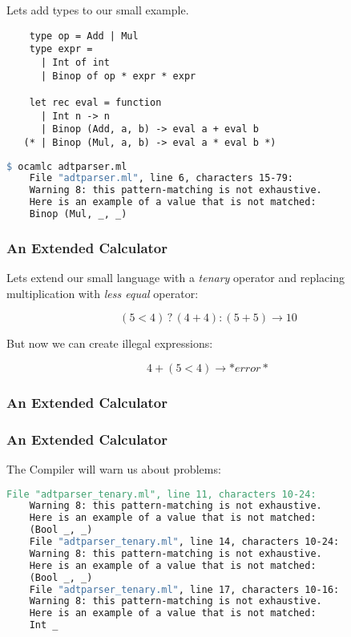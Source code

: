 \documentclass[xcolor=svgnames]{beamer}
\renewcommand{\_}{\mathunderscore}
\begin{document}
\begin{frame}[fragile]
  Lets add types to our small example.

  \begin{lstlisting}
    type op = Add | Mul
    type expr =
      | Int of int
      | Binop of op * expr * expr

    let rec eval = function
      | Int n -> n
      | Binop (Add, a, b) -> eval a + eval b
   (* | Binop (Mul, a, b) -> eval a * eval b *)

  \end{lstlisting}
  \pause
  \begin{lstlisting}[language=make]
    $ ocamlc adtparser.ml
    File "adtparser.ml", line 6, characters 15-79:
    Warning 8: this pattern-matching is not exhaustive.
    Here is an example of a value that is not matched:
    Binop (Mul, _, _)
  \end{lstlisting}

\end{frame}

\begin{frame}[fragile]
  \frametitle{An Extended Calculator}
  Lets extend our small language with a \textit{tenary} operator and
  replacing multiplication with  \textit{less equal} operator:

  \[(5 < 4) \mathbin? (4 + 4) : (5 + 5) \to 10\]

  \pause
  But now we can create illegal expressions:

  \[4 + (5 < 4) \to *error*\]

\end{frame}

\begin{frame}[fragile]
  \frametitle{An Extended Calculator}
  
\end{frame}

\begin{frame}[fragile]
  \frametitle{An Extended Calculator}
  The Compiler will warn us about problems:
  \begin{lstlisting}[basicstyle={\footnotesize\ttfamily},language=make]
    File "adtparser_tenary.ml", line 11, characters 10-24:
    Warning 8: this pattern-matching is not exhaustive.
    Here is an example of a value that is not matched:
    (Bool _, _)
    File "adtparser_tenary.ml", line 14, characters 10-24:
    Warning 8: this pattern-matching is not exhaustive.
    Here is an example of a value that is not matched:
    (Bool _, _)
    File "adtparser_tenary.ml", line 17, characters 10-16:
    Warning 8: this pattern-matching is not exhaustive.
    Here is an example of a value that is not matched:
    Int _
  \end{lstlisting}

\end{frame}
\end{document}
